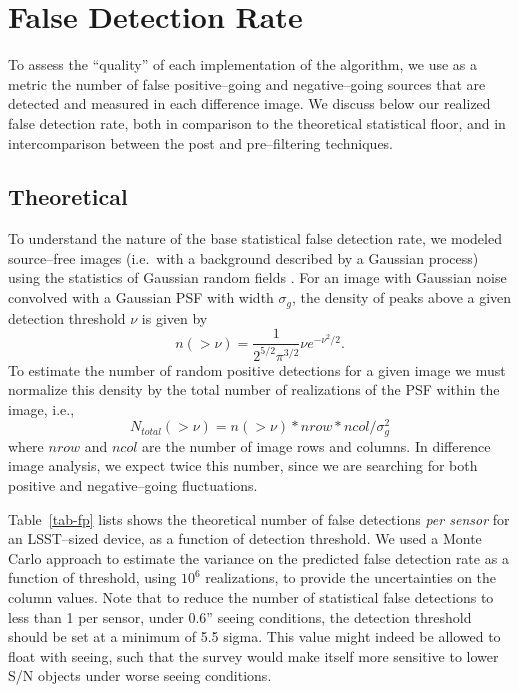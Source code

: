\documentclass[iop]{emulateapj}
\begin{document}
\section{False Detection Rate}

To assess the ``quality'' of each implementation of the algorithm, we use as a metric the number of false positive--going and negative--going sources that are detected and measured in each difference image.
We discuss below our realized false detection rate, both in comparison to the theoretical statistical floor, and in intercomparison between the post and pre--filtering techniques.

\subsection{Theoretical \label{sec-analyticfp}}

To understand the nature of the base statistical false detection rate, we modeled source--free images (i.e.\ with a background described by a Gaussian process) using the statistics of Gaussian random fields \citep{Kaiser-PointSources}.
For an image with Gaussian noise convolved with a Gaussian PSF with width $\sigma_g$, the density of peaks above a given detection threshold $\nu$ is given by
\begin{equation}
n(>\nu) = \frac{1}{2^{5/2}\pi^{3/2}} \nu e^{-\nu^2 /2}.
\label{eq-theory}
\end{equation}
To estimate the number of random positive detections for a given image we must normalize this density by the total number of realizations of the PSF within the image, i.e.,
\begin{equation}
N_{total}(>\nu) = n(>\nu)*nrow*ncol/ \sigma_g^2
\label{eq-theorytot}
\end{equation}
where $nrow$ and $ncol$ are the number of image rows and columns.
In difference image analysis, we expect twice this number, since we are searching for both positive and negative--going fluctuations.

Table~\ref{tab-fp} lists shows the theoretical number of false detections {\it per sensor} for an LSST--sized device, as a function of detection threshold.
We used a Monte Carlo approach to estimate the variance on the predicted false detection rate as a function of threshold, using $10^6$ realizations, to provide the uncertainties on the column values.
Note that to reduce the number of statistical false detections to less than 1 per sensor, under 0.6'' seeing conditions, the detection threshold should be set at a minimum of 5.5 sigma.
This value might indeed be allowed to float with seeing, such that the survey would make itself more sensitive to lower S/N objects under worse seeing conditions.
\end{document}
